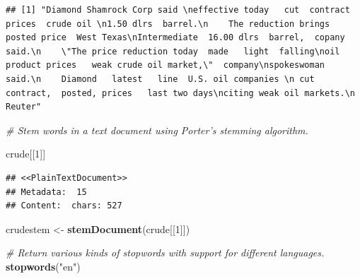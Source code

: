 \documentclass[]{book}
\newenvironment{Shaded}{\begin{snugshade}}{\end{snugshade}}
\newcommand{\KeywordTok}[1]{\textcolor[rgb]{0.13,0.29,0.53}{\textbf{{#1}}}}
\newcommand{\DecValTok}[1]{\textcolor[rgb]{0.00,0.00,0.81}{{#1}}}
\newcommand{\StringTok}[1]{\textcolor[rgb]{0.31,0.60,0.02}{{#1}}}
\newcommand{\CommentTok}[1]{\textcolor[rgb]{0.56,0.35,0.01}{\textit{{#1}}}}
\newcommand{\NormalTok}[1]{{#1}}
\begin{document}
\begin{Shaded}
\end{Shaded}

\begin{verbatim}
## [1] "Diamond Shamrock Corp said \neffective today   cut  contract prices  crude oil \n1.50 dlrs  barrel.\n    The reduction brings  posted price  West Texas\nIntermediate  16.00 dlrs  barrel,  copany said.\n    \"The price reduction today  made   light  falling\noil product prices   weak crude oil market,\"  company\nspokeswoman said.\n    Diamond   latest   line  U.S. oil companies \n cut  contract,  posted, prices   last two days\nciting weak oil markets.\n Reuter"
\end{verbatim}

\begin{Shaded}
\begin{Highlighting}[]
\CommentTok{# Stem words in a text document using Porter’s stemming algorithm.}

\NormalTok{crude[[}\DecValTok{1}\NormalTok{]]}
\end{Highlighting}
\end{Shaded}

\begin{verbatim}
## <<PlainTextDocument>>
## Metadata:  15
## Content:  chars: 527
\end{verbatim}

\begin{Shaded}
\begin{Highlighting}[]
\NormalTok{crudestem <-}\StringTok{ }\KeywordTok{stemDocument}\NormalTok{(crude[[}\DecValTok{1}\NormalTok{]])}

\CommentTok{# Return various kinds of stopwords with support for different languages.}
\KeywordTok{stopwords}\NormalTok{(}\StringTok{"en"}\NormalTok{)}
\end{Highlighting}
\end{Shaded}
\end{document}
